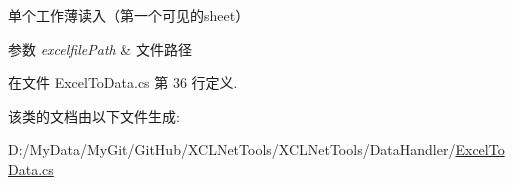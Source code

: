 单个工作薄读入（第一个可见的sheet） 
\begin{DoxyParams}{参数}
{\em excelfile\-Path} & 文件路径\\
\hline
\end{DoxyParams}




在文件 Excel\-To\-Data.\-cs 第 36 行定义.



该类的文档由以下文件生成\-:\begin{DoxyCompactItemize}
\item 
D\-:/\-My\-Data/\-My\-Git/\-Git\-Hub/\-X\-C\-L\-Net\-Tools/\-X\-C\-L\-Net\-Tools/\-Data\-Handler/\hyperlink{_excel_to_data_8cs}{Excel\-To\-Data.\-cs}\end{DoxyCompactItemize}
